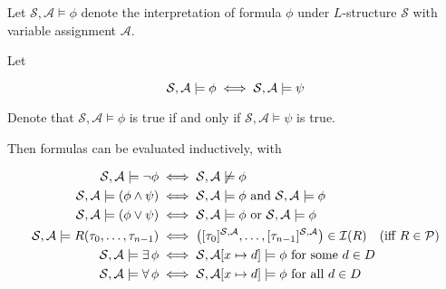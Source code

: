 \begin{remark}
    Let $\mathcal{S}, \mathcal{A} \models \phi$ denote the interpretation of formula $\phi$ 
    under $L$-structure $\mathcal{S}$ with variable assignment $\mathcal{A}$.
    
    Let
    
    \begin{equation*}
        \mathcal{S}, \mathcal{A} \models \phi \;\Longleftrightarrow\; \mathcal{S}, \mathcal{A} \models \psi
    \end{equation*}
    
    Denote that $\mathcal{S}, \mathcal{A} \models \phi$ is true if and only if
    $\mathcal{S}, \mathcal{A} \models \psi$ is true.
\end{remark}

\begin{definition}
    Then formulas can be evaluated inductively, with
    
    \begin{align}
        \mathcal{S}, \mathcal{A} \models \neg \phi 
            &\;\Longleftrightarrow\; \mathcal{S}, \mathcal{A} \not\models \phi \\
        \mathcal{S}, \mathcal{A} \models (\phi \land \psi)
            &\;\Longleftrightarrow\; \mathcal{S}, \mathcal{A} \models \phi
                \text{ and } \mathcal{S}, \mathcal{A} \models \phi \\
        \mathcal{S}, \mathcal{A} \models (\phi \lor \psi)
            &\;\Longleftrightarrow\; \mathcal{S}, \mathcal{A} \models \phi
                \text{ or } \mathcal{S}, \mathcal{A} \models \phi \\
        \mathcal{S}, \mathcal{A} \models R(\tau_0, \dots, \tau_{n-1})
            &\;\Longleftrightarrow\; \left(
                [\tau_0]^{\mathcal{S}, \mathcal{A}},
                \ldots, 
                [\tau_{n-1}]^{\mathcal{S}, \mathcal{A}} 
            \right) \in \mathcal{I}(R) \quad\text{(iff $R \in \mathcal{P}$)} \\
        \mathcal{S}, \mathcal{A} \models \operatorname{\exists} \phi
            &\;\Longleftrightarrow\; \mathcal{S}, \mathcal{A}[x \mapsto d] \models \phi 
            \text{ for some } d \in D \\
        \mathcal{S}, \mathcal{A} \models \operatorname{\forall} \phi
            &\;\Longleftrightarrow\; \mathcal{S}, \mathcal{A}[x \mapsto d] \models \phi
            \text{ for all } d \in D
    \end{align}
\end{definition}
